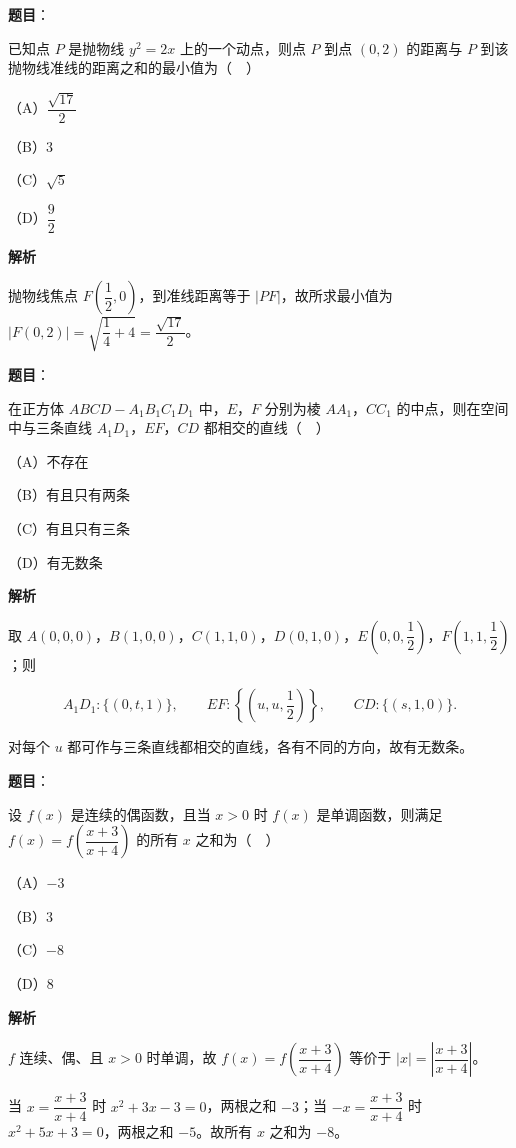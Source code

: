 \begin{answer}

\textbf{题目}：

已知点 $P$ 是抛物线 $y^2=2x$ 上的一个动点，则点 $P$ 到点 $(0,2)$ 的距离与 $P$ 到该抛物线准线的距离之和的最小值为（　）

（A）$\dfrac{\sqrt{17}}{2}$

（B）$3$

（C）$\sqrt5$

（D）$\dfrac92$

\textbf{解析}

抛物线焦点 $F\left(\dfrac12,0\right)$，到准线距离等于 $|PF|$，故所求最小值为 $|F(0,2)|=\sqrt{\dfrac14+4}=\dfrac{\sqrt{17}}2$。


\end{answer}
\begin{answer}

\textbf{题目}：

在正方体 $ABCD-A_1B_1C_1D_1$ 中，$E$，$F$ 分别为棱 $AA_1$，$CC_1$ 的中点，则在空间中与三条直线 $A_1D_1$，$EF$，$CD$ 都相交的直线（　）

（A）不存在

（B）有且只有两条

（C）有且只有三条

（D）有无数条

\textbf{解析}

取 $A(0,0,0)$，$B(1,0,0)$，$C(1,1,0)$，$D(0,1,0)$，$E\left(0,0,\dfrac12\right)$，$F\left(1,1,\dfrac12\right)$；则

\nopagebreak[4]
\[A_1D_1:\{(0,t,1)\},\qquad EF:\left\{\left(u,u,\frac12\right)\right\},\qquad CD:\{(s,1,0)\}.\]

对每个 $u$ 都可作与三条直线都相交的直线，各有不同的方向，故有无数条。


\end{answer}
\begin{answer}

\textbf{题目}：

设 $f(x)$ 是连续的偶函数，且当 $x>0$ 时 $f(x)$ 是单调函数，则满足 $f(x)=f\left(\dfrac{x+3}{x+4}\right)$ 的所有 $x$ 之和为（　）

（A）$-3$

（B）$3$

（C）$-8$

（D）$8$

\textbf{解析}

$f$ 连续、偶、且 $x>0$ 时单调，故 $f(x)=f\left(\dfrac{x+3}{x+4}\right)$ 等价于 $|x|=\left|\dfrac{x+3}{x+4}\right|$。

当 $x=\dfrac{x+3}{x+4}$ 时 $x^2+3x-3=0$，两根之和 $-3$；当 $-x=\dfrac{x+3}{x+4}$ 时 $x^2+5x+3=0$，两根之和 $-5$。故所有 $x$ 之和为 $-8$。


\end{answer}
